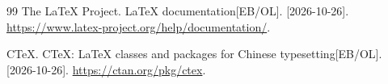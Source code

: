 \begin{thebibliography}{99}
  The LaTeX Project. LaTeX documentation[EB/OL]. [2026-10-26].
  \url{https://www.latex-project.org/help/documentation/}.

  CTeX. CTeX: LaTeX classes and packages for Chinese typesetting[EB/OL]. [2026-10-26].
  \url{https://ctan.org/pkg/ctex}.
\end{thebibliography}
